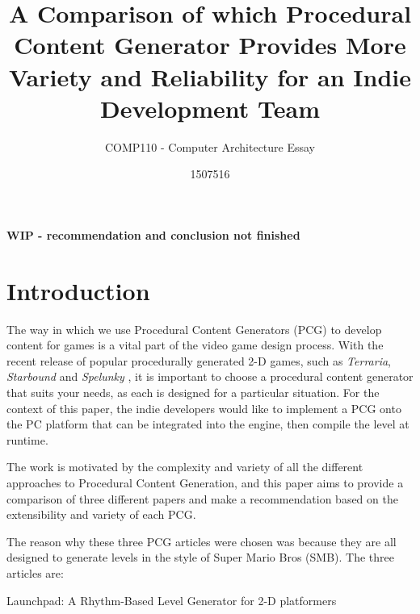 \documentclass{scrartcl}
\title{A Comparison of which Procedural Content Generator Provides More Variety and Reliability for an Indie Development Team}
\subtitle{COMP110 - Computer Architecture Essay}
\author{1507516}
\begin{document}
\maketitle

\begin{center}
\textbf{WIP - recommendation and conclusion not finished}

\end{center}




\section{Introduction}

The way in which we use Procedural Content Generators (PCG) to develop content for games is a vital part of the video game design process. With the recent release of popular procedurally generated 2-D games, such as \textit{Terraria}, \textit{Starbound} and \textit{Spelunky} \cite{steamtopgames}, it is important to choose a procedural content generator that suits your needs, as each is designed for a particular situation. For the context of this paper, the indie developers would like to implement a PCG onto the PC platform that can be integrated into the engine, then compile the level at runtime.

The work is motivated by the complexity and variety of all the different approaches to Procedural Content Generation, and this paper aims to provide a comparison of three different papers and make a recommendation based on the extensibility and variety of each PCG. 

The reason why these three PCG articles were chosen was because they are all designed to generate levels in the style of Super Mario Bros (SMB).
The three articles are:

Launchpad: A Rhythm-Based Level Generator for 2-D platformers \cite{smith2009} \par
\end{document}
